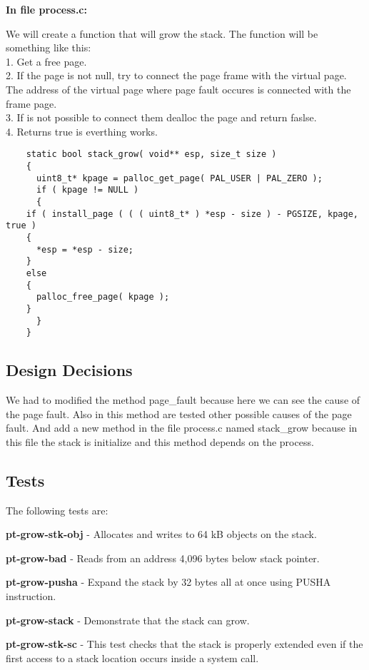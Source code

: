 \textbf{In file process.c: }

We will create a function that will grow the stack. The function will be something like this:
      \\1. Get a free page. 
      \\2. If the page is not null, try to connect the page frame with the virtual page. The address of the virtual page where page fault occures is connected with the frame page.
      \\3. If is not possible to connect them dealloc the page and return faslse.
      \\4. Returns true is everthing works.

\begin{lstlisting}
    static bool stack_grow( void** esp, size_t size )
    {
      uint8_t* kpage = palloc_get_page( PAL_USER | PAL_ZERO );
      if ( kpage != NULL )
      {
	if ( install_page ( ( ( uint8_t* ) *esp - size ) - PGSIZE, kpage, true )
	{
	  *esp = *esp - size;
	}
	else
	{
	  palloc_free_page( kpage );
	}
      }
    }
\end{lstlisting}


\subsection{Design Decisions}

We had to modified the method page\_fault because here we can see the cause of the page fault. Also in this method are tested other possible causes of the page fault. And add a new method in the file process.c named stack\_grow because in this file the stack is initialize and this method depends on the process.


\subsection{Tests}

The following tests are: 

\textbf{pt-grow-stk-obj} - Allocates and writes to 64 kB objects on the stack. 

\textbf{pt-grow-bad} - Reads from an address 4,096 bytes below stack pointer. 

\textbf{pt-grow-pusha} - Expand the stack by 32 bytes all at once using PUSHA instruction. 

\textbf{pt-grow-stack} - Demonstrate that the stack can grow. 

\textbf{pt-grow-stk-sc} - This test checks that the stack is properly extended even if the first access to a stack location occurs inside a system call. 



